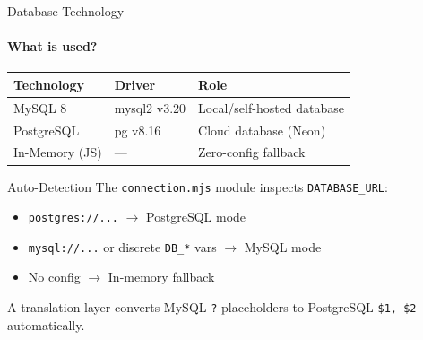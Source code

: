 \documentclass[aspectratio=169, 12pt]{beamer}
\begin{document}
\begin{frame}{Database Technology}
\framesubtitle{What is used?}

\begin{center}
\begin{tabular}{l l l}
\toprule
\textbf{Technology} & \textbf{Driver} & \textbf{Role} \\
\midrule
MySQL 8 & mysql2 v3.20 & Local/self-hosted database \\
PostgreSQL & pg v8.16 & Cloud database (Neon) \\
In-Memory (JS) & --- & Zero-config fallback \\
\bottomrule
\end{tabular}
\end{center}

\vspace{8pt}
\begin{block}{Auto-Detection}
The \texttt{connection.mjs} module inspects \texttt{DATABASE\_URL}:
\begin{itemize}\itemsep=1pt
    \item \texttt{postgres://...} $\rightarrow$ PostgreSQL mode
    \item \texttt{mysql://...} or discrete \texttt{DB\_*} vars $\rightarrow$ MySQL mode
    \item No config $\rightarrow$ In-memory fallback
\end{itemize}
A translation layer converts MySQL \texttt{?} placeholders to PostgreSQL \texttt{\$1, \$2} automatically.
\end{block}
\end{frame}
\end{document}
